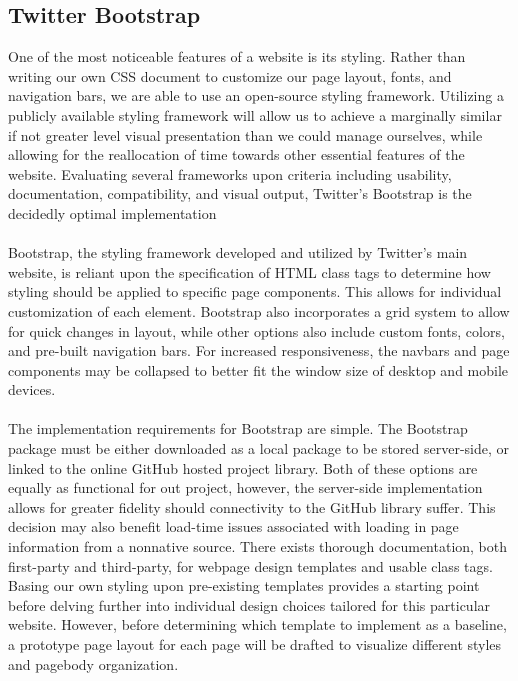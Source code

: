 \documentclass[letterpaper,10pt, draftclsnofoot,onecolumn]{IEEEtran}
\begin{document}
{{\subsection[Twitter Bootstrap]{\noindent\color{black}
Twitter Bootstrap}
{\noindent\color{black}
One of the most noticeable features of a website is its styling. 
Rather than writing our own CSS document to customize our page layout, fonts, and navigation bars, we are able to use an open-source styling framework. 
Utilizing a publicly available styling framework will allow us to achieve a marginally similar if not greater level visual presentation than we could manage ourselves, while allowing for the reallocation of time towards other essential features of the website. 
Evaluating several frameworks upon criteria including usability, documentation, compatibility, and visual output, Twitter's Bootstrap is the decidedly optimal implementation
\\ \\
Bootstrap, the styling framework developed and utilized by Twitter's main website, is reliant upon the specification of HTML class tags to determine how styling should be applied to specific page components. 
This allows for individual customization of each element. 
Bootstrap also incorporates a grid system to allow for quick changes in layout, while other options also include custom fonts, colors, and pre-built navigation bars. 
For increased responsiveness, the navbars and page components may be collapsed to better fit the window size of desktop and mobile devices.  
\\ \\
The implementation requirements for Bootstrap are simple. 
The Bootstrap package must be either downloaded as a local package to be stored server-side, or linked to the online GitHub hosted project library. Both of these options are equally as functional for out project, however, the server-side implementation allows for greater fidelity should connectivity to the GitHub library suffer.
This decision may also benefit load-time issues associated with loading in page information from a nonnative source. There exists thorough documentation, both first-party and third-party, for webpage design templates and usable class tags.
Basing our own styling upon pre-existing templates provides a starting point before delving further into individual design choices tailored for this particular website.
However, before determining which template to implement as a baseline, a prototype page layout for each page will be drafted to visualize different styles and pagebody organization. 
}}}
\end{document}
